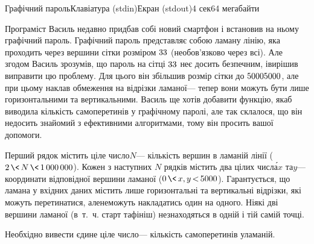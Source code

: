 \documentclass[14pt,a4paper]{extarticle}
\def\dib#1{\,#1\discretionary{}{\mbox{$#1$}}{}\,}
\begin{document}
\begin{problem}{Графічний пароль}{Клавіатура (stdin)}{Екран (stdout)}{4 сек}{64 мегабайти}


Програміст Василь недавно придбав собі новий смартфон і встановив на ньому графічний пароль. Графічний пароль представляє собою ламану лінію, яка проходить через вершини сітки розміром $3{\*}3$ (не\nolinebreak[3] обов'язково через всі). Але згодом Василь зрозумів, що пароль на сітці $3{\*}3$ не\nolinebreak[3] є досить безпечним, і\nolinebreak[3] вирішив виправити цю проблему. Для цього він збільшив розмір сітки до $5000{\*}5000$, але при цьому наклав обмеження на відрізки ламаної\nolinebreak[3] --- тепер вони можуть бути лише горизонтальними та вертикальними. Василь ще хотів добавити функцію, яка\nolinebreak[3] б виводила кількість самоперетинів у графічному паролі, але так склалося, що він не\nolinebreak[3] досить знайомий з ефективними алгоритмами, тому він просить вашої допомоги.

\InputFile
Перший рядок містить ціле число\nolinebreak[3] $N$\nolinebreak[3] --- кількість вершин в ламаній лінії ($2\dib{{\<}}N\dib{{\<}}{1\,000\,000}$). Кожен з наступних $N$ рядків містить два цілих числ\'{а}\nolinebreak[1] $x$ та\nolinebreak[3] $y$\nolinebreak[3] --- координати відповідної вершини ламаної ($0\dib{{\<}}{x, y}\dib{{<}}5000$). Гарантується, що ламана у вхідних даних містить лише горизонтальні та вертикальні відрізки, які можуть перетинатися, але\nolinebreak[1] не\nolinebreak[3] можуть накладатись один на одного. Ніякі дві вершини ламаної (в~т.~ч. старт та\nolinebreak[2] фініш) не\nolinebreak[3] знаходяться в одній і тій самій точці.

\OutputFile
Необхідно вивести єдине ціле число\nolinebreak[3] --- кількість самоперетинів у\nolinebreak[3] ламаній.

\vspace{-\baselineskip}

\Examples
\begin{exampleSimple}{5em}{3em}%
%
\end{exampleSimple} %
\begin{exampleSimple}{5em}{3em}%
%
\end{exampleSimple}

\end{problem}
\end{document}
